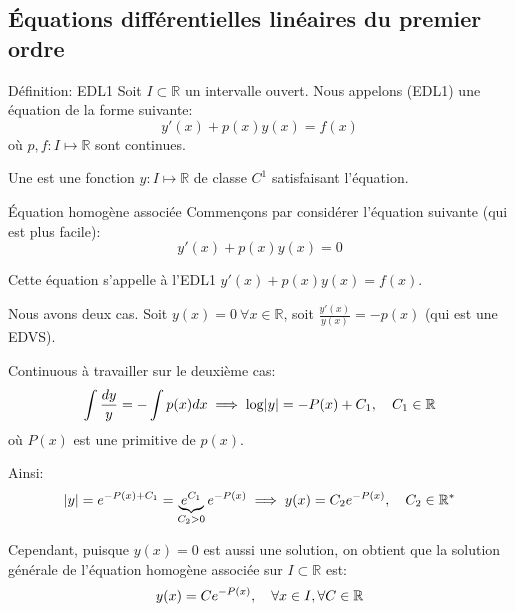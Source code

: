 \documentclass[a4paper]{article}
\begin{document}
\subsection[EDL1]{Équations différentielles linéaires du premier ordre}
\begin{parag}{Définition: EDL1}
    Soit $I \subset \mathbb{R}$ un intervalle ouvert. Nous appelons  (EDL1) une équation de la forme suivante:
    \[y'\left(x\right) + p\left(x\right) y\left(x\right) = f\left(x\right)\]
    où $p, f : I \mapsto \mathbb{R}$ sont continues.


    Une  est une fonction $y : I \mapsto \mathbb{R}$ de classe $C^1$ satisfaisant l'équation.
\end{parag}

\begin{parag}{Équation homogène associée}
    Commençons par considérer l'équation suivante (qui est plus facile):
    \[y'\left(x\right) + p\left(x\right) y\left(x\right) = 0\]

    Cette équation s'appelle  à l'EDL1 $y'\left(x\right) + p\left(x\right)y\left(x\right) = f\left(x\right)$.

    Nous avons deux cas. Soit $y\left(x\right) = 0\ \forall x \in \mathbb{R}$, soit $\frac{y'\left(x\right)}{y\left(x\right)} = -p\left(x\right)$ (qui est une EDVS).

    Continuous à travailler sur le deuxième cas:
    \[\int \frac{dy}{y} = -\int p\left(x\right)dx \implies \log\left|y\right| = -P\left(x\right) + C_1, \mathspace C_1 \in \mathbb{R}\]
    où $P\left(x\right)$ est une primitive de $p\left(x\right)$.

    Ainsi:
    \[\left|y\right| = e^{-P\left(x\right) + C_1} = \underbrace{e^{C_1}}_{C_2 > 0} e^{-P\left(x\right)} \implies y\left(x\right) = C_2 e^{-P\left(x\right)}, \mathspace C_2 \in \mathbb{R}^* \]

    Cependant, puisque $y\left(x\right) = 0$ est aussi une solution, on obtient que la solution générale de l'équation homogène associée sur $I \subset \mathbb{R}$ est:
    \[y\left(x\right) = Ce^{-P\left(x\right)}, \mathspace \forall x \in I, \forall C \in \mathbb{R}\]
\end{parag}
\end{document}
